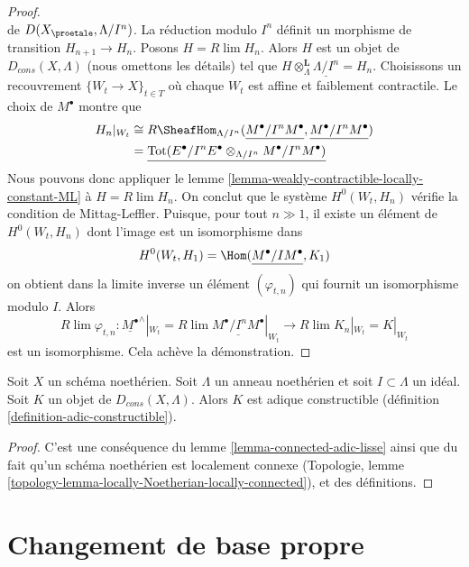 \begin{proof}
$$$$
de $D(X_\proetale, \Lambda/I^n)$. La réduction modulo $I^n$ définit un
morphisme de transition $H_{n + 1} \to H_n$. Posons $H = R\lim H_n$. Alors $H$ est un
objet de $D_{cons}(X, \Lambda)$ (nous omettons les détails) tel que
$H \otimes_\Lambda^\mathbf{L} \underline{\Lambda/I^n} = H_n$.
Choisissons un recouvrement $\{W_t \to X\}_{t \in T}$ où chaque $W_t$
est affine et faiblement contractile. Le choix de $M^\bullet$
montre que
\begin{align*}
H_n|_{W_t} & \cong 
R\SheafHom_{\Lambda/I^n}(\underline{M^\bullet/I^nM^\bullet},
\underline{M^\bullet/I^nM^\bullet}) \\
& =
\underline{
\text{Tot}(E^\bullet/I^nE^\bullet \otimes_{\Lambda/I^n} M^\bullet/I^nM^\bullet)
}
\end{align*}
Nous pouvons donc appliquer le lemme \ref{lemma-weakly-contractible-locally-constant-ML}
à $H = R\lim H_n$. On conclut que le système $H^0(W_t, H_n)$ vérifie la condition de
Mittag-Leffler. Puisque, pour tout $n \gg 1$, il existe un élément de $H^0(W_t, H_n)$
dont l'image est un isomorphisme dans
$$
H^0(W_t, H_1) = \Hom(\underline{M^\bullet/IM^\bullet}, K_1)
$$
on obtient dans la limite inverse un élément $(\varphi_{t, n})$
qui fournit un isomorphisme modulo $I$. Alors
$$
R\lim \varphi_{t, n} :
\underline{M^\bullet}^\wedge|_{W_t} =
R\lim \underline{M^\bullet/I^nM^\bullet}|_{W_t}
\longrightarrow
R\lim K_n|_{W_t} = K|_{W_t}
$$
est un isomorphisme. Cela achève la démonstration.
\end{proof}

\begin{proposition}
\label{proposition-Noetherian-adic-constructible}
Soit $X$ un schéma noethérien. Soit $\Lambda$ un anneau noethérien et
soit $I \subset \Lambda$ un idéal. Soit $K$ un objet de
$D_{cons}(X, \Lambda)$. Alors $K$ est adique constructible
(définition \ref{definition-adic-constructible}).
\end{proposition}

\begin{proof}
C'est une conséquence du lemme \ref{lemma-connected-adic-lisse}
ainsi que du fait qu'un schéma noethérien est localement connexe
(Topologie, lemme \ref{topology-lemma-locally-Noetherian-locally-connected}),
et des définitions.
\end{proof}







\section{Changement de base propre}
\label{section-proper-base-change}

